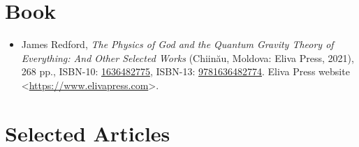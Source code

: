 \documentclass[letterpaper,11pt]{article}
\newcommand{\dsc}{\discretionary{}{}{}}
\begin{document}
\section{Book}
\label{sec:Book}

\begin{itemize}
\small
\item James Redford, \emph{The Physics of God and the Quantum Gravity Theory of Everything: And Other Selected Works} (Chiin\u{a}u, Moldova: Eliva Press, 2021), 268 pp., ISBN-10: \href{https://www.bookfinder.com/book/1636482775/}{1636482775}, ISBN-13: \href{https://en.wikipedia.org/wiki/Special:BookSources?isbn=9781636482774}{9781636482774}. Eliva Press website \textless\href{https://www.elivapress.com}{\textsf{https\dsc :\dsc //\dsc www\dsc .elivapress\dsc .com}}\textgreater.
\end{itemize}

\section{Selected Articles}
\label{sec:SelectedArticles}
\end{document}
